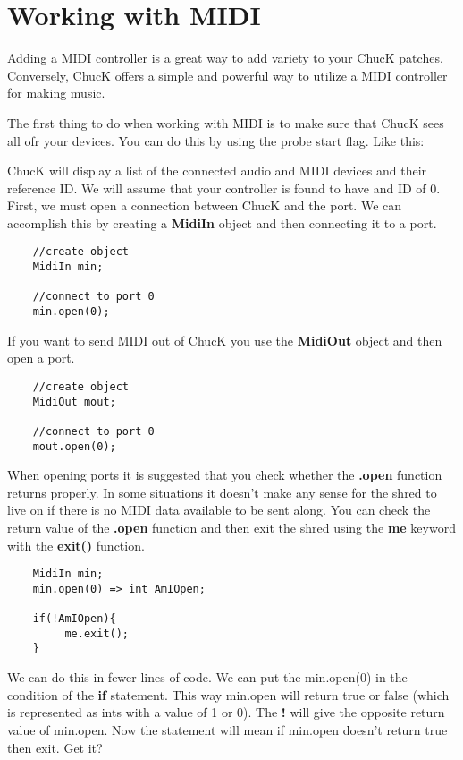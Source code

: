 \section{Working with MIDI}

Adding a MIDI controller is a great way to add variety to your ChucK patches. Conversely, ChucK offers a simple and powerful way to utilize a MIDI controller for making music.  

The first thing to do when working with MIDI is to make sure that ChucK sees all ofr your devices. You can do this by using the \doubledash probe start flag. Like this:


ChucK will display a list of the connected audio and MIDI devices and their reference ID. We will assume that your controller is found to have and ID of 0. First, we must open a connection between ChucK and the port. We can accomplish this by creating a {\bf MidiIn} object and then connecting it to a port. 

\begin{verbatim}
    //create object
    MidiIn min;

    //connect to port 0
    min.open(0);
\end{verbatim}

If you want to send MIDI out of ChucK you use the {\bf MidiOut} object and then open a port. 

\begin{verbatim}
    //create object
    MidiOut mout;

    //connect to port 0
    mout.open(0);
\end{verbatim}

When opening ports it is suggested that you check whether the {\bf .open} function returns properly. In some situations it doesn't make any sense for the shred to live on if there is no MIDI data available to be sent along. You can check the return value of the {\bf .open} function and then exit the shred using the {\bf me} keyword with the {\bf exit()} function.

\begin{verbatim}
    MidiIn min;
    min.open(0) => int AmIOpen;

    if(!AmIOpen){
         me.exit();
    }
\end{verbatim}

We can do this in fewer lines of code. We can put the min.open(0) in the condition of the {\bf if} statement. This way min.open will return true or false (which is represented as ints with a value of 1 or 0). The {\bf !} will give the opposite return value of min.open. Now the statement will mean if min.open doesn't return true then exit. Get it?

